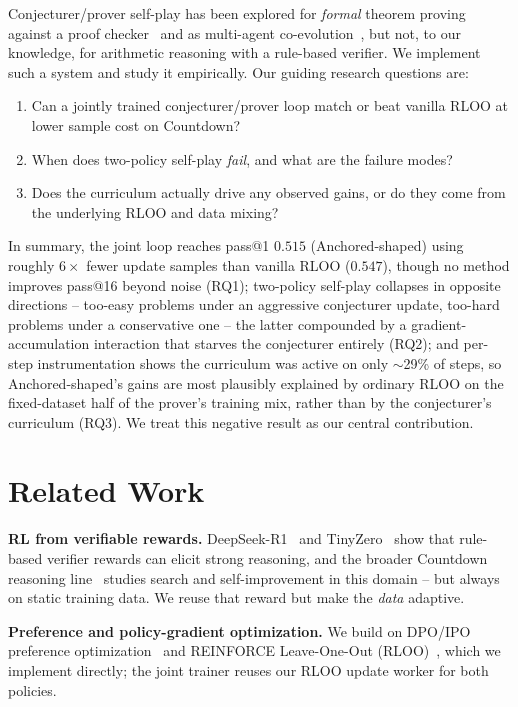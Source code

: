 \documentclass{article}
\begin{document}
Conjecturer/prover self-play has been explored for \emph{formal} theorem
proving against a proof checker~\cite{dongma} and as multi-agent
co-evolution~\cite{subramaniam}, but not, to our knowledge, for arithmetic
reasoning with a rule-based verifier. We implement such a system and study it
empirically. Our guiding research questions are:
\begin{enumerate}[leftmargin=1.4em,itemsep=1pt]
  \item Can a jointly trained conjecturer/prover loop match or beat
  vanilla RLOO at lower sample cost on Countdown?
  \item When does two-policy self-play \emph{fail}, and what are the
  failure modes?
  \item Does the curriculum actually drive any observed gains, or
  do they come from the underlying RLOO and data mixing?
\end{enumerate}
In summary, the joint loop reaches pass@1 $0.515$ (Anchored-shaped) using roughly $6\times$
fewer update samples than vanilla RLOO ($0.547$), though no method improves
pass@16 beyond noise (RQ1); two-policy self-play collapses in opposite directions
 -- too-easy problems under an aggressive conjecturer update, too-hard
problems under a conservative one -- the latter compounded by a
gradient-accumulation interaction that starves the conjecturer entirely (RQ2);
and per-step instrumentation shows the curriculum was active on only $\sim$29\% of
steps, so Anchored-shaped's gains are most plausibly explained by ordinary RLOO on
the fixed-dataset half of the prover's training mix, rather than by the
conjecturer's curriculum (RQ3). We treat this negative result as our
central contribution.

\section{Related Work}
\textbf{RL from verifiable rewards.} DeepSeek-R1~\cite{deepseekr1} and
TinyZero~\cite{tinyzero} show that rule-based verifier rewards can elicit
strong reasoning, and the broader Countdown reasoning line~\cite{gandhi2024sos}
studies search and self-improvement in this domain -- but always on static
training data. We reuse that reward but make the \emph{data} adaptive.

\textbf{Preference and policy-gradient optimization.} We build on DPO/IPO
preference optimization~\cite{rafailov2023dpo,azar2023ipo} and REINFORCE
Leave-One-Out (RLOO)~\cite{ahmadian2024rloo}, which we implement directly; the
joint trainer reuses our RLOO update worker for both policies.
\end{document}
